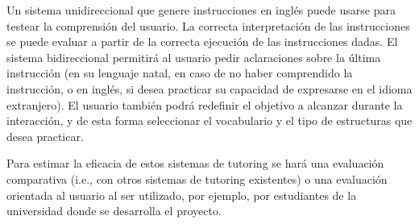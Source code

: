 Un sistema unidireccional que genere instrucciones en ingl\'es puede
usarse para testear la comprensi\'on del usuario.  La correcta
interpretaci\'on de las instrucciones se puede evaluar a partir de la
correcta ejecuci\'on de las instrucciones dadas.  El sistema
bidireccional permitir\'a al usuario pedir aclaraciones sobre la
\'ultima instrucci\'on (en su lenguaje natal, en caso de no haber comprendido
la instrucci\'on, o en ingl\'es, si desea practicar su
capacidad de expresarse en el idioma extranjero).  El usuario tambi\'en
podr\'a redefinir el objetivo a alcanzar durante la interacci\'on, y
de esta forma seleccionar el vocabulario y el tipo de estructuras que desea
practicar.

Para estimar la eficacia de estos sistemas de tutoring se har\'a una evaluaci\'on comparativa (i.e., con otros
sistemas de tutoring existentes) o una evaluaci\'on orientada al usuario al ser utilizado, por ejemplo, por estudiantes de la universidad donde se desarrolla el proyecto.










